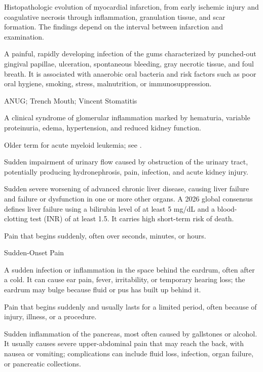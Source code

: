  Histopathologic evolution of myocardial infarction, from early ischemic injury and coagulative necrosis through inflammation, granulation tissue, and scar formation. The findings depend on the interval between infarction and examination.

 A painful, rapidly developing infection of the gums characterized by punched-out gingival papillae, ulceration, spontaneous bleeding, gray necrotic tissue, and foul breath. It is associated with anaerobic oral bacteria and risk factors such as poor oral hygiene, smoking, stress, malnutrition, or immunosuppression.

\synonyms
ANUG; Trench Mouth; Vincent Stomatitis

 A clinical syndrome of glomerular inflammation marked by hematuria, variable proteinuria, edema, hypertension, and reduced kidney function.

 Older term for acute myeloid leukemia; see .

 Sudden impairment of urinary flow caused by obstruction of the urinary tract,
potentially producing hydronephrosis, pain, infection, and acute kidney injury.

 Sudden severe worsening of advanced chronic
liver disease, causing liver failure and failure or dysfunction in one or more other
organs. A 2026 global consensus defines liver failure using a bilirubin level of at
least 5 mg/dL and a blood-clotting test (INR) of at least 1.5. It carries high short-term risk of death.

 Pain that begins suddenly, often over seconds, minutes, or hours.

\synonyms
Sudden-Onset Pain

 A sudden infection or inflammation in the space behind the eardrum, often after a cold. It can cause ear pain, fever, irritability, or temporary hearing loss; the eardrum may bulge because fluid or pus has built up behind it.

 Pain that begins suddenly and usually lasts for a limited period, often because of injury, illness, or a procedure.

 Sudden inflammation of the pancreas, most often caused by gallstones or alcohol. It usually causes severe upper-abdominal pain that may reach the back, with nausea or vomiting; complications can include fluid loss, infection, organ failure, or pancreatic collections.

